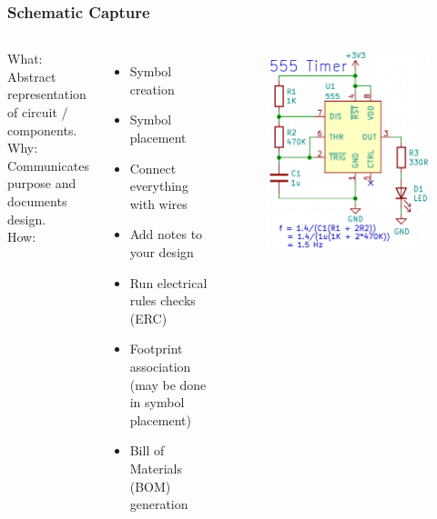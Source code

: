 \documentclass[aspectratio=169, t]{beamer}
\begin{document}
\begin{frame}
\frametitle{Schematic Capture}
\begin{columns}
	What: Abstract representation of circuit / components.\\
	Why: Communicates purpose and documents design.\\
	How:
	\begin{itemize}
		\item Symbol creation
		\item Symbol placement
		\item Connect everything with wires
		\item Add notes to your design
		\item Run electrical rules checks (ERC)
		\item Footprint association (may be done in symbol placement)
		\item Bill of Materials (BOM) generation
	\end{itemize}
	
	\vspace{-8mm}
	\begin{figure}
		\includegraphics[width=\linewidth]{images/555-schematic-snip.png}
	\end{figure}
\end{columns}
\end{frame}
\end{document}
